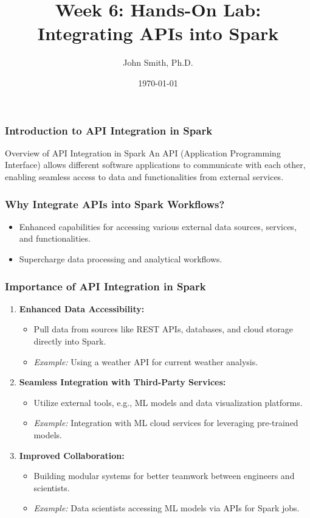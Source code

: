 \documentclass[aspectratio=169]{beamer}
\title[Week 6: Hands-On Lab: Integrating APIs into Spark]{Week 6: Hands-On Lab: Integrating APIs into Spark}
\author[J. Smith]{John Smith, Ph.D.}
\institute[University Name]{Department of Computer Science \\ University Name \\ Email: email@university.edu \\ Website: www.university.edu}
\date{\today}
\begin{document}
\frame{\titlepage}

\begin{frame}[fragile]
    \frametitle{Introduction to API Integration in Spark}
    \begin{block}{Overview of API Integration in Spark}
        An API (Application Programming Interface) allows different software applications to communicate with each other, enabling seamless access to data and functionalities from external services.
    \end{block}
\end{frame}

\begin{frame}[fragile]
    \frametitle{Why Integrate APIs into Spark Workflows?}
    \begin{itemize}
        \item Enhanced capabilities for accessing various external data sources, services, and functionalities.
        \item Supercharge data processing and analytical workflows.
    \end{itemize}
\end{frame}

\begin{frame}[fragile]
    \frametitle{Importance of API Integration in Spark}
    \begin{enumerate}
        \item \textbf{Enhanced Data Accessibility:}
            \begin{itemize}
                \item Pull data from sources like REST APIs, databases, and cloud storage directly into Spark.
                \item \textit{Example:} Using a weather API for current weather analysis.
            \end{itemize}
        \item \textbf{Seamless Integration with Third-Party Services:}
            \begin{itemize}
                \item Utilize external tools, e.g., ML models and data visualization platforms.
                \item \textit{Example:} Integration with ML cloud services for leveraging pre-trained models.
            \end{itemize}
        \item \textbf{Improved Collaboration:}
            \begin{itemize}
                \item Building modular systems for better teamwork between engineers and scientists.
                \item \textit{Example:} Data scientists accessing ML models via APIs for Spark jobs.
            \end{itemize}
    \end{enumerate}
\end{frame}
\end{document}
